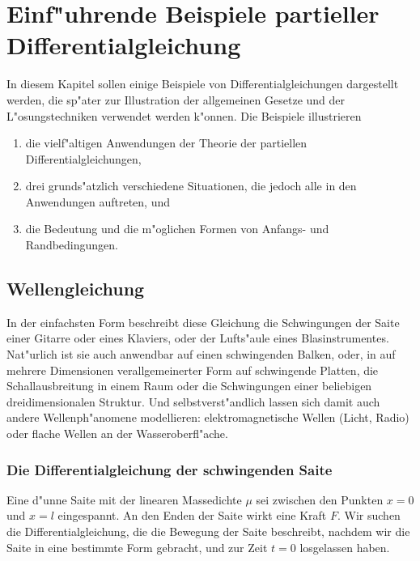 %
%
%
\chapter{Einf"uhrende Beispiele partieller Differentialgleichung\label{chapter-beispiele}}
In diesem Kapitel sollen einige Beispiele von Differentialgleichungen
dargestellt werden, die sp"ater zur Illustration der allgemeinen
Gesetze und der L"osungstechniken verwendet werden k"onnen.
Die Beispiele illustrieren
\begin{enumerate}
\item die vielf"altigen Anwendungen der Theorie der partiellen 
Differentialgleichungen,
\item drei grunds"atzlich verschiedene
Situationen, die jedoch alle in den Anwendungen auftreten, und
\item die Bedeutung und die m"oglichen Formen von Anfangs-
und Randbedingungen.
\end{enumerate}

\section{Wellengleichung}
In der einfachsten Form beschreibt diese Gleichung die Schwingungen der
Saite einer Gitarre oder eines Klaviers, oder der Lufts"aule eines
Blasinstrumentes.
Nat"urlich ist sie auch anwendbar auf einen schwingenden
Balken, oder, in auf mehrere Dimensionen verallgemeinerter Form auf
schwingende Platten, die Schallausbreitung in einem Raum oder die Schwingungen
einer beliebigen dreidimensionalen Struktur.
Und selbstverst"andlich
lassen sich damit auch andere Wellen\-ph"a\-no\-mene modellieren:
elektromagnetische Wellen (Licht, Radio) oder flache Wellen an der
Wasseroberfl"ache.

\subsection{Die Differentialgleichung der schwingenden Saite}
Eine d"unne Saite mit der linearen Massedichte $\mu$ sei zwischen den
Punkten $x=0$ und $x=l$ eingespannt. An den Enden der Saite wirkt eine
Kraft $F$. Wir suchen die Differentialgleichung, die die Bewegung der Saite
beschreibt, nachdem wir die Saite in eine bestimmte Form gebracht, und
zur Zeit $t=0$ losgelassen haben.

